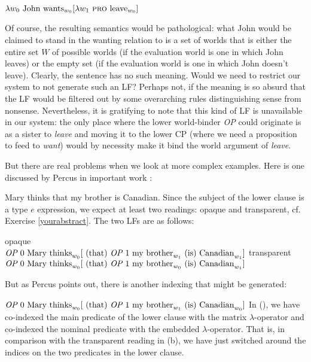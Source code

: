 \ex $\lambda w_{0} \mbox{ John wants}_{w_{0}} [ \lambda w_{1} \mbox{ \textsc{pro} } \mbox{leave}_{w_{0}} ]$ \xe

Of course, the resulting semantics would be pathological: what John would be
claimed to stand in the wanting relation to is a set of worlds that is either
the entire set $W$ of possible worlds (if the evaluation world is one in which
John leaves) or the empty set (if the evaluation world is one in which John
doesn't leave). Clearly, the sentence has no such meaning. Would we need to
restrict our system to not generate such an LF? Perhaps not, if the meaning is
so absurd that the LF would be filtered out by some overarching rules
distinguishing sense from nonsense. Nevertheless, it is gratifying to note that
this kind of LF is unavailable in our system: the only place where the lower
world-binder \emph{OP} could originate is as a sister to \emph{leave} and moving
it to the lower CP (where we need a proposition to feed to \emph{want}) would by
necessity make it bind the world argument of \emph{leave}.

But there are real problems when we look at more complex examples. Here is one
discussed by Percus in important work \parencite{percus-2000-constraints}:

\ex Mary thinks that my brother is Canadian. \xe
%
Since the subject of the lower clause is a type $e$ expression, we expect at least
two readings: opaque and transparent, cf. Exercise \ref{yourabstract}. The two
LFs are as follows:

\pex
\a opaque\\
$\emph{OP } 0 \mbox{ Mary thinks}_{w_{0}} [ \mbox{ (that) } \emph{OP } 1 \mbox{ my brother}_{w_{1}} \mbox{ (is) Canadian}_{w_{1}} ]$
\a transparent\\
$\emph{OP } 0 \mbox{ Mary thinks}_{w_{0}} [ \mbox{ (that) } \emph{OP } 1 \mbox{ my brother}_{w_{0}} \mbox{ (is) Canadian}_{w_{1}} ]$
\xe

But as Percus points out, there is another indexing that might be generated:

\ex $\emph{OP } 0 \mbox{ Mary thinks}_{w_{0}} [ \mbox{ (that) } \emph{OP } 1 \mbox{ my brother}_{w_{1}} \mbox{ (is) Canadian}_{w_{0}} ]$ \xe
%
In (\lastx), we have co-indexed the main predicate of the lower clause with the
matrix $\lambda$-operator and co-indexed the nominal predicate
 with the embedded $\lambda$-operator. That is, in
comparison with the transparent reading in (\blastx b), we have just switched
around the indices on the two predicates in the lower clause.

